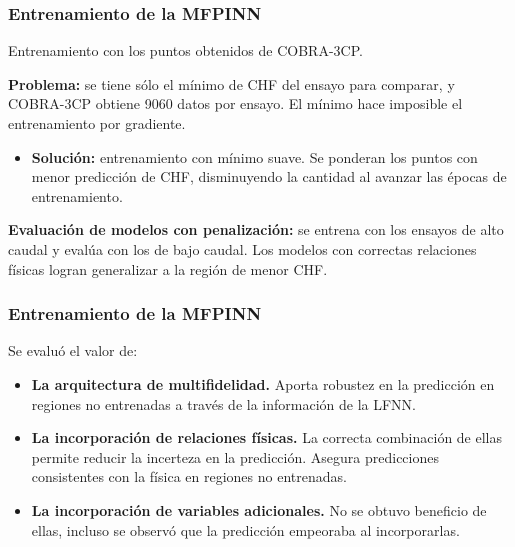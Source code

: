 \documentclass{beamer}
\begin{document}
\begin{frame}
\end{frame}

\begin{frame}
    \frametitle{Entrenamiento de la MFPINN}

    Entrenamiento con los puntos obtenidos de COBRA-3CP.
    \vspace{0.5cm}

    \textbf{Problema:} se tiene sólo el mínimo de CHF del ensayo para comparar, y COBRA-3CP obtiene 9060 datos por ensayo. El mínimo hace imposible el entrenamiento por gradiente.
    \begin{itemize}
        \item \textbf{Solución:} entrenamiento con mínimo suave. Se ponderan los puntos con menor predicción de CHF, disminuyendo la cantidad al avanzar las épocas de entrenamiento.
    \end{itemize}
    \vspace{0.5cm}

    \textbf{Evaluación de modelos con penalización:} se entrena con los ensayos de alto caudal y evalúa con los de bajo caudal. Los modelos con correctas relaciones físicas logran generalizar a la región de menor CHF.
\end{frame}

\begin{frame}
    \frametitle{Entrenamiento de la MFPINN}
    Se evaluó el valor de:
    \begin{itemize}
        \item \textbf{La arquitectura de multifidelidad.} Aporta robustez en la predicción en regiones no entrenadas a través de la información de la LFNN.
        \item \textbf{La incorporación de relaciones físicas.} La correcta combinación de ellas permite reducir la incerteza en la predicción. Asegura predicciones consistentes con la física en regiones no entrenadas.
        \item \textbf{La incorporación de variables adicionales.} No se obtuvo beneficio de ellas, incluso se observó que la predicción empeoraba al incorporarlas.
    \end{itemize}

\end{frame}
\end{document}
